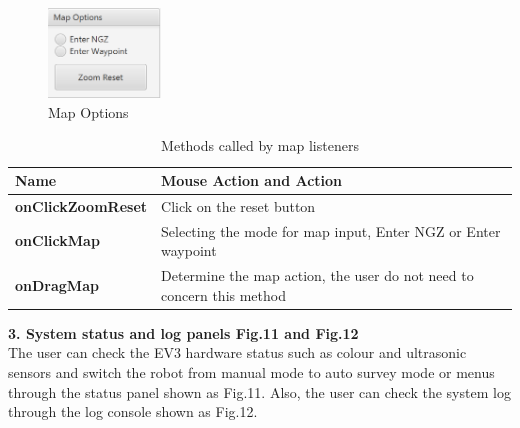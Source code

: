 \begin{figure}[H]
	\centering
	\includegraphics[width=30mm]{MapOptions.png}  
	\caption{Map Options}
	\label{fig:Map Options}                
\end{figure}


\begin{table}[]
	\centering
	\caption{Methods called by map listeners}
	\label{Methods called by map listeners}
	\begin{tabular}{|l|l|}
		\hline
		\textbf{Name}             & Mouse Action and Action                                                                                                                                                                                                                             \\ \hline
		\textbf{onClickZoomReset} & Click on the reset button                                                                                                                                                                                                                           \\ \hline
		\textbf{onClickMap}       & Selecting the mode for map input, Enter NGZ or Enter waypoint \\ \hline
		\textbf{onDragMap}        & Determine the map action, the user do not need to concern this method                                                                                                                                                                               \\ \hline
	\end{tabular}
\end{table}
	
\textbf{3. System status and log panels Fig.11 and Fig.12}\\
The user can check the EV3 hardware status such as colour and ultrasonic sensors and switch the robot from manual mode to auto survey mode or menus through the status panel shown as Fig.11. Also, the user can check the system log through the log console shown as Fig.12.\newline

